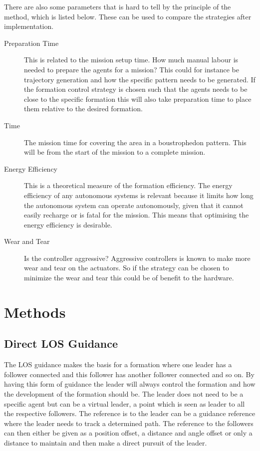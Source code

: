 There are also some parameters that is hard to tell by the principle
of the method, which is listed below. These can be used to compare the
strategies after implementation.
\begin{description}
\item[Preparation Time] This is related to the mission setup time. How
	much manual labour is needed to prepare the agents for a mission?
	This could for instance be trajectory generation and how the
	specific pattern needs to be generated. If the formation control strategy is chosen such that the agents needs to be close to the specific formation this will also take preparation time to place them relative to the desired formation.
\item[Time] The mission time for covering the area in a boustrophedon
	pattern. This will be from the start of the mission to a complete mission.
\item[Energy Efficiency] This is a theoretical measure of the
	formation efficiency. The energy efficiency of any autonomous systems is relevant because it limits how long the autonomous system can operate autonomously, given that it cannot easily recharge or is fatal for the mission. This means that optimising the energy efficiency is desirable.
\item[Wear and Tear] Is the controller aggressive? Aggressive
	controllers is known to make more wear and tear on the actuators. So
	if the strategy can be chosen to minimize the wear and tear this
	could be of benefit to the hardware.
\end{description}


\section{Methods}

\subsection{Direct LOS Guidance}
The \ac{LOS} guidance makes the basis for a formation where one leader has a follower connected and this follower has another follower connected and so on. By having this form of guidance the leader will always control the formation and how the development of the formation should be. The leader does not need to be a specific agent but can be a virtual leader, a point which is seen as leader to all the respective followers. The reference is to the leader can be a guidance reference where the leader needs to track a determined path. The reference to the followers can then either be given as a position offset, a distance and angle offset or only a distance to maintain and then make a direct pursuit of the leader.
